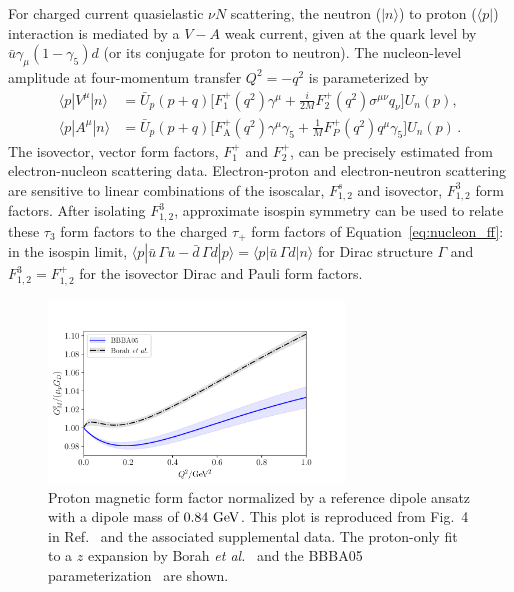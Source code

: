 \documentclass{ar-1col}
\def\asm#1{{\color{blue}#1}}
\def\del#1{}
\begin{document}
For charged current quasielastic $\nu N$ scattering,
the neutron ($|n\rangle$) to proton ($\langle p|$)
interaction is \del{described}\asm{mediated} by a $V-A$ weak \del{interaction}\asm{current},
 given at the quark level by $\bar{u}\gamma_\mu(1- \gamma_5)d$
 (or its conjugate for proton to neutron)\del{, with the }\asm{.
 The} nucleon\asm{-}level amplitude at four-momentum transfer $Q^2 = -q^2$ \asm{is} parameterized by
\begin{align}\label{eq:nucleon_ff}
\langle p | V^\mu | n \rangle
    &= \bar{U}_p(p+q) \Big[
        F_1^+(q^2) \gamma^\mu
        +\frac{i}{2M} F_2^+(q^2) \sigma^{\mu\nu} q_\nu
    \Big] U_n(p),
\nonumber\\
\langle p | A^\mu | n \rangle
    &= \bar{U}_p(p+q) \Big[
        F_{\mathrm{A}}^+(q^2) \gamma^\mu \gamma_5
        +\frac{1}{M} F_P^+(q^2) q^\mu \gamma_5
    \Big] U_n(p)\, .
\end{align}
The isovector, vector form factors, $F_1^+$ and $F_2^+$, can be precisely estimated from electron-nucleon scattering data.
Electron-proton and electron-neutron scattering are sensitive to \asm{linear combinations of} the isoscalar, $F_{1,2}^s$ and isovector, $F_{1,2}^3$ form factors.  After isolating $F_{1,2}^3$, approximate isospin symmetry can be used to relate these $\tau_3$ form factors to the charged $\tau_+$ form factors of Equation~\eqref{eq:nucleon_ff}: in the isospin limit, $\langle p| \bar{u}\, \Gamma u - \bar{d}\, \Gamma d |p\rangle = \langle p| \bar{u}\, \Gamma d |n\rangle$
 for Dirac structure $\Gamma$ and $F_{1,2}^3 = F_{1,2}^+$
 for the isovector Dirac and Pauli form factors.
\begin{figure}
 \centering
 \includegraphics[width=0.7\textwidth]{plots/proton_magnetic-standalone.pdf}
 \vspace{4pt}
\caption{
Proton magnetic form factor normalized by a reference dipole ansatz
with a dipole mass of $0.84~{\rm GeV}$.
This plot is reproduced from Fig.~4 in Ref.~\cite{Borah:2020gte}
 and the associated supplemental data.
The proton-only fit to a $z$ expansion by Borah {\it et al.}~\cite{Borah:2020gte}
and the BBBA05 parameterization~\cite{Bradford:2006yz} are shown.
\label{fig:protonmagneticff}
}
\end{figure}
\end{document}
